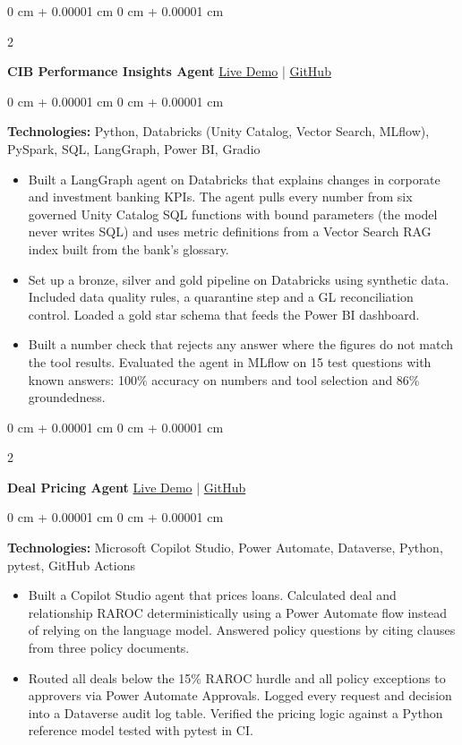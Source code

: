 \documentclass[10pt, letterpaper]{article}
\newenvironment{highlights}{
    \begin{itemize}[
        topsep=0.10 cm,
        parsep=0.10 cm,
        partopsep=0pt,
        itemsep=0pt,
        leftmargin=0 cm + 10pt
    ]
}{
    \end{itemize}
} %
\newenvironment{onecolentry}{
    \begin{adjustwidth}{
        0 cm + 0.00001 cm
    }{
        0 cm + 0.00001 cm
    }
}{
    \end{adjustwidth}
} %
\newenvironment{twocolentry}[2][]{
    \onecolentry
    \def\secondColumn{#2}
    \setcolumnwidth{\fill, 4.5 cm}
    \begin{paracol}{2}
}{
    \switchcolumn \raggedleft \secondColumn
    \end{paracol}
    \endonecolentry
} %
\begin{document}
        \begin{twocolentry}{
            \href{https://insights.inkandinfra.com}{Live Demo} |
            \href{https://github.com/hpk369/northlake-cib-insights-agent}{GitHub}
        }
            \textbf{CIB Performance Insights Agent}\end{twocolentry}
        \vspace{0.10 cm}
        \begin{onecolentry}
            \textbf{Technologies:}\> Python, Databricks (Unity Catalog, Vector Search, MLflow), PySpark, SQL, LangGraph, Power BI, Gradio
            \begin{highlights}
                \item Built a LangGraph agent on Databricks that explains changes in corporate and investment banking KPIs. The agent pulls every number from six governed Unity Catalog SQL functions with bound parameters (the model never writes SQL) and uses metric definitions from a Vector Search RAG index built from the bank’s glossary.
                \item Set up a bronze, silver and gold pipeline on Databricks using synthetic data. Included data quality rules, a quarantine step and a GL reconciliation control. Loaded a gold star schema that feeds the Power BI dashboard.
                \item Built a number check that rejects any answer where the figures do not match the tool results. Evaluated the agent in MLflow on 15 test questions with known answers: 100\% accuracy on numbers and tool selection and 86\% groundedness.
            \end{highlights}
        \end{onecolentry}

        \begin{twocolentry}{
            \href{https://deals.inkandinfra.com}{Live Demo} |
            \href{https://github.com/hpk369/northlake-deal-pricing-agent}{GitHub}
        }
            \textbf{Deal Pricing Agent}\end{twocolentry}
        \vspace{0.10 cm}
        \begin{onecolentry}
            \textbf{Technologies:}\> Microsoft Copilot Studio, Power Automate, Dataverse, Python, pytest, GitHub Actions
            \begin{highlights}
                \item Built a Copilot Studio agent that prices loans. Calculated deal and relationship RAROC deterministically using a Power Automate flow instead of relying on the language model. Answered policy questions by citing clauses from three policy documents.
                \item Routed all deals below the 15\% RAROC hurdle and all policy exceptions to approvers via Power Automate Approvals. Logged every request and decision into a Dataverse audit log table. Verified the pricing logic against a Python reference model tested with pytest in CI.
            \end{highlights}
        \end{onecolentry}
\end{document}
